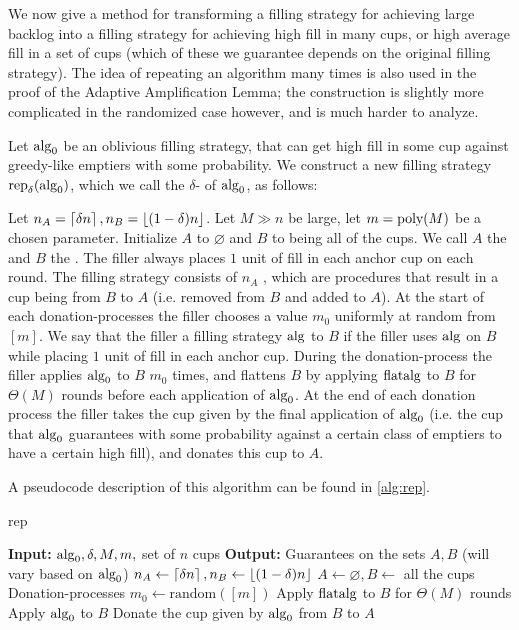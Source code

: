 We now give a method for transforming a filling strategy for achieving
large backlog into a filling strategy for achieving high fill in
many cups, or high average fill in a set of cups (which of these
we guarantee depends on the original filling strategy). The idea
of repeating an algorithm many times is also used in the proof of
the Adaptive Amplification Lemma; the construction is slightly more
complicated in the randomized case however, and is much harder to
analyze.

\begin{definition}
  \label{def:rep}
  {\normalfont
  Let $\operatorname{\text{\textup{alg}}}_0$ be an oblivious filling strategy, that can get
  high fill in some cup against greedy-like emptiers with some
  probability. We construct a new filling strategy
  $\operatorname{\text{\textup{rep}}}_\delta(\operatorname{\text{\textup{alg}}}_0)$, which we call the
  $\delta$- of $\operatorname{\text{\textup{alg}}}_0$, as follows:

  Let $n_A = \left\lceil \delta n \right\rceil, n_B = \left\lfloor (1-\delta)n \right\rfloor$. Let $M
  \gg n$ be large, let $m=\operatorname{\text{poly}}(M)$ be a chosen parameter. 
  Initialize $A$ to $\varnothing$ and $B$ to
  being all of the cups. We call $A$ the  and
  $B$ the . The filler always places $1$
  unit of fill in each anchor cup on each round. The filling
  strategy consists of $n_A$ , which are
  procedures that result in a cup being  from $B$
  to $A$ (i.e. removed from $B$ and added to $A$). At the start
  of each donation-processes the filler chooses a value $m_0$
  uniformly at random from $[m]$. We say that the filler
   a filling strategy $\operatorname{\text{\textup{alg}}}$ to $B$ if the
  filler uses $\operatorname{\text{\textup{alg}}}$ on $B$ while placing $1$ unit of fill
  in each anchor cup. During the donation-process the filler
  applies $\operatorname{\text{\textup{alg}}}_0$ to $B$ $m_0$ times, and flattens $B$ by
  applying $\operatorname{\text{\textup{flatalg}}}$ to $B$ for $\Theta(M)$ rounds before each
  application of $\operatorname{\text{\textup{alg}}}_0$. At the end of each donation process
  the filler takes the cup given by the final application of
  $\operatorname{\text{\textup{alg}}}_0$ (i.e. the cup that $\operatorname{\text{\textup{alg}}}_0$ guarantees with some
  probability against a certain class of emptiers to have a
  certain high fill), and donates this cup to $A$. 

 A pseudocode description of this algorithm can be found in
 \cref{alg:rep}.
 }

\begin{algorithm}
  \caption{rep}
  \label{alg:rep}
  \begin{algorithmic}
    \State \textbf{Input:} $\operatorname{\text{\textup{alg}}}_0, \delta, M, m, $ set of $n$ cups
    \State \textbf{Output:} Guarantees on the sets $A, B$ (will vary based on $\operatorname{\text{\textup{alg}}}_0$)
    \State
    \State $n_A \gets \left\lceil \delta n \right\rceil, n_B \gets \left\lfloor (1-\delta) n \right\rfloor$
    \State $A \gets \varnothing, B \gets$ all the cups
     \Comment Donation-processes
    \State $m_0 \gets \text{random}([m])$
        \State Apply $\operatorname{\text{\textup{flatalg}}}$ to $B$ for $\Theta(M)$ rounds
        \State Apply $\operatorname{\text{\textup{alg}}}_0$ to $B$
      \EndFor
      \State Donate the cup given by $\operatorname{\text{\textup{alg}}}_0$ from $B$ to $A$
    \EndFor
  \end{algorithmic}
\end{algorithm}
\end{definition}


